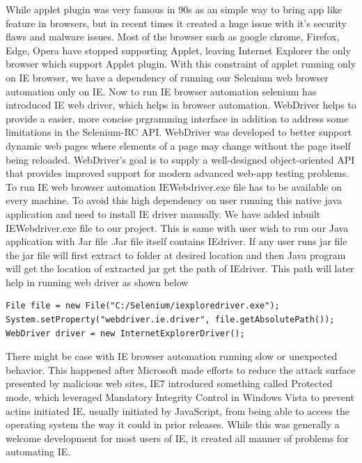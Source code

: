 \documentclass[article,type=msc,colorback,accentcolor=tud9c,twoside,11pt]{tudthesis}
\begin{document}
While applet plugin was very famous in 90s as an simple way to bring app like feature in browsers, but in recent times it created a huge issue with it's security flaws and malware issues. Most of the browser such as google chrome, Firefox, Edge, Opera have stopped supporting Applet, leaving Internet Explorer the only browser which support Applet plugin.
With this constraint of applet running only on IE browser, we have a dependency of running our Selenium web browser automation only on IE. Now to run IE browser automation selenium has introduced IE web driver, which helps in browser automation. WebDriver helps to provide a easier, more concise prgramming interface in addition to address some limitations in the Selenium-RC API. WebDriver was developed to better support dynamic web pages where elements of a page may change without the page itself being reloaded. WebDriver's goal is to supply a well-designed object-oriented API that provides improved support for modern advanced web-app testing problems. To run IE web browser automation IEWebdriver.exe file has to be available on every machine. To avoid this high dependency on user running this native java application and need to install IE driver manually. We have added inbuilt IEWebdriver.exe file to our project. This is same with user wish to run our Java application with Jar file .Jar file itself contains IEdriver. If any user runs jar file the jar file will first extract to folder at desired location and then Java program will get the location of extracted jar get the path of IEdriver. This path will later help in running web driver as shown below
\begin{lstlisting}
File file = new File("C:/Selenium/iexploredriver.exe");
System.setProperty("webdriver.ie.driver", file.getAbsolutePath());
WebDriver driver = new InternetExplorerDriver();
\end{lstlisting}
There might be case with IE browser automation running slow or unexpected behavior. This happened after Microsoft made efforts to reduce the attack surface presented by malicious web sites, IE7 introduced something called Protected mode, which leveraged Mandatory Integrity Control in Windows Vista to prevent actins initiated IE, usually initiated by JavaScript, from being able to access the operating system the way it could in prior releases. While this was generally a welcome development for most users of IE, it created all manner of problems for automating IE.
\end{document}

